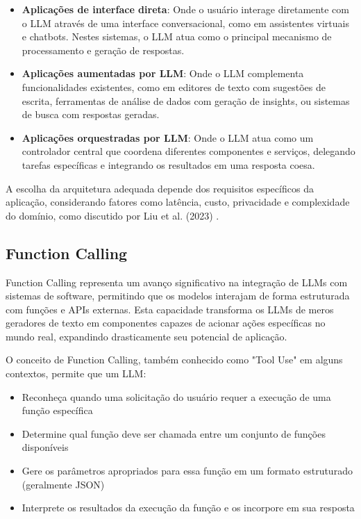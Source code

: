 \documentclass[tcc,capa]{texufpel}
\begin{document}
\begin{itemize}
    \item \textbf{Aplicações de interface direta}: Onde o usuário interage diretamente com o LLM através de uma interface conversacional, como em assistentes virtuais e chatbots. Nestes sistemas, o LLM atua como o principal mecanismo de processamento e geração de respostas.
    
    \item \textbf{Aplicações aumentadas por LLM}: Onde o LLM complementa funcionalidades existentes, como em editores de texto com sugestões de escrita, ferramentas de análise de dados com geração de insights, ou sistemas de busca com respostas geradas.
    
    \item \textbf{Aplicações orquestradas por LLM}: Onde o LLM atua como um controlador central que coordena diferentes componentes e serviços, delegando tarefas específicas e integrando os resultados em uma resposta coesa.
\end{itemize}

A escolha da arquitetura adequada depende dos requisitos específicos da aplicação, considerando fatores como latência, custo, privacidade e complexidade do domínio, como discutido por Liu et al. (2023) \cite{liu2023evaluating}.

\subsection{Function Calling}

Function Calling representa um avanço significativo na integração de LLMs com sistemas de software, permitindo que os modelos interajam de forma estruturada com funções e APIs externas. Esta capacidade transforma os LLMs de meros geradores de texto em componentes capazes de acionar ações específicas no mundo real, expandindo drasticamente seu potencial de aplicação.

O conceito de Function Calling, também conhecido como "Tool Use" em alguns contextos, permite que um LLM:

\begin{itemize}
    \item Reconheça quando uma solicitação do usuário requer a execução de uma função específica
    \item Determine qual função deve ser chamada entre um conjunto de funções disponíveis
    \item Gere os parâmetros apropriados para essa função em um formato estruturado (geralmente JSON)
    \item Interprete os resultados da execução da função e os incorpore em sua resposta
\end{itemize}
\end{document}
